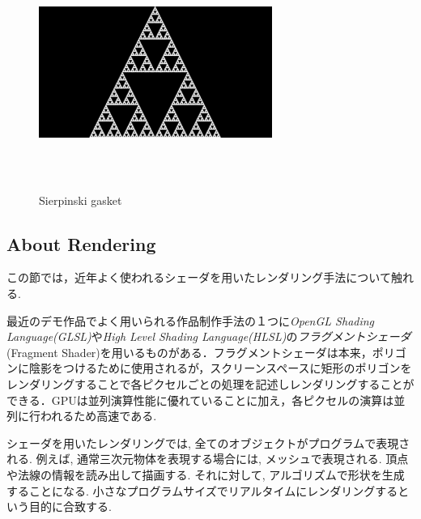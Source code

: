 \begin{figure}[htbp]
 \begin{center}
      \includegraphics[width=3in, height=3in, keepaspectratio]{../img/fractal/gasket.pdf}
    \caption{Sierpinski gasket}
    \label{fig:gasket}
 \end{center}
\end{figure}

\subsection{About Rendering}

この節では，近年よく使われるシェーダを用いたレンダリング手法について触れる. 

最近のデモ作品でよく用いられる作品制作手法の１つに{\it OpenGL Shading Language(GLSL)}や{\it High Level Shading Language(HLSL)}の\emph{フラグメントシェーダ}(Fragment Shader)を用いるものがある．フラグメントシェーダは本来，ポリゴンに陰影をつけるために使用されるが，スクリーンスペースに矩形のポリゴンをレンダリングすることで各ピクセルごとの処理を記述しレンダリングすることができる．GPUは並列演算性能に優れていることに加え，各ピクセルの演算は並列に行われるため高速である. 

シェーダを用いたレンダリングでは, 全てのオブジェクトがプログラムで表現される.
例えば,  通常三次元物体を表現する場合には, メッシュで表現される. 
頂点や法線の情報を読み出して描画する.
それに対して, アルゴリズムで形状を生成することになる.  
小さなプログラムサイズでリアルタイムにレンダリングするという目的に合致する. 

